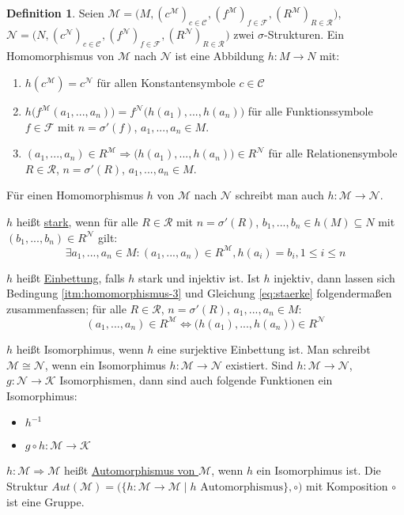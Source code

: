 \documentclass{article}
\theoremstyle{definition}
\newtheorem{dfn}{Definition}[section]
\theoremstyle{plain}
\newcommand{\m}[1]{\mathcal{#1}}
\newcommand{\struc}[3]{\big(#1, (c^{#2})_{c \in \m{C}_{#3}}, (f^{#2})_{f \in \m{F}_{#3}}, (R^{#2})_{R \in \m{R}_{#3}}\big)}
\begin{document}
    \begin{dfn}
        Seien $ \m{M} = \struc{M}{\m{M}}{} $, $ \m{N} = \struc{N}{\m{N}}{} $ zwei $ \sigma $-Strukturen.
        Ein Homomorphismus von $ \m{M} $ nach $ \m{N} $ ist eine Abbildung $ h : M \rightarrow N $ mit:
        \begin{enumerate}
            \item $ h(c^\m{M}) = c^\m{N} $ für allen Konstantensymbole $ c \in \m{C} $
            \item $ h\big(f^\m{M}(a_1, ..., a_n)\big) = f^\m{N}\big(h(a_1), ..., h(a_n)\big) $ für alle Funktionssymbole $ f \in \m{F} $ mit $ n = \sigma'(f) $, $ a_1, ..., a_n \in M $.
            \item \label{itm:homomorphismus-3} $ (a_1, ..., a_n) \in R^\m{M} \Rightarrow \big(h(a_1), ..., h(a_n)) \in R^\m{N} $ für alle Relationensymbole $ R \in \m{R} $, $ n = \sigma'(R) $, $ a_1, ..., a_n \in M $.
        \end{enumerate}

            Für einen Homomorphismus $ h $ von $ \m{M} $ nach $ \m{N} $ schreibt man auch $ h : \m{M} \rightarrow \m{N} $.

            $ h $ heißt \underline{stark}, wenn für alle $ R \in \m{R} $ mit $ n = \sigma'(R) $, $ b_1, ..., b_n \in h(M) \subseteq N $ mit $ (b_1, ..., b_n) \in R^\m{N} $ gilt:
            \begin{equation}
                \label{eq:staerke}
                \exists a_1, ..., a_n \in M : (a_1, ..., a_n) \in R^\m{M}, h(a_i) = b_i, 1 \leq i \leq n
            \end{equation}

            $ h $ heißt \underline{Einbettung}, falls $ h $ stark und injektiv ist.
            Ist $ h $ injektiv, dann lassen sich Bedingung \ref{itm:homomorphismus-3} und Gleichung \eqref{eq:staerke} folgendermaßen zusammenfassen; für alle $ R \in \m{R} $, $ n = \sigma'(R) $, $ a_1, ..., a_n \in M $:
            \begin{equation*}
                (a_1, ..., a_n) \in R^\m{M} \Leftrightarrow \big(h(a_1), ..., h(a_n)\big) \in R^\m{N}
            \end{equation*}

            $ h $ heißt Isomorphimus, wenn $ h $ eine surjektive Einbettung ist.
            Man schreibt $ \m{M} \cong \m{N} $, wenn ein Isomorphimus $ h : \m{M} \rightarrow \m{N} $ existiert.
            Sind $ h : \m{M} \rightarrow \m{N} $, $ g : \m{N} \rightarrow \m{K} $ Isomorphismen, dann sind auch folgende Funktionen ein Isomorphimus:
            \begin{itemize}
                \item $ h^{-1} $
                \item $ g \circ h : \m{M} \rightarrow \m{K} $
            \end{itemize}

            $ h : \m{M} \Rightarrow \m{M} $ heißt \underline{Automorphismus von $ \m{M} $}, wenn $ h $ ein Isomorphimus ist.
            Die Struktur $ Aut(\m{M}) = \big( \{ h : \m{M} \rightarrow \m{M} \mid h \text{ Automorphismus} \}, \circ \big) $ mit Komposition $ \circ $ ist eine Gruppe.
    \end{dfn}
\end{document}
